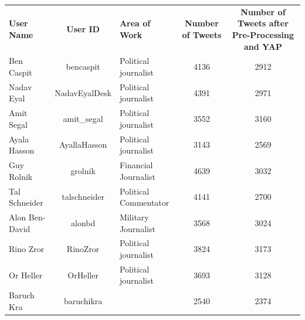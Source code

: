 \documentclass[a4paper]{article}
\begin{document}
\begin{table}[htbp]
  \centering
    \begin{tabular}{lcp{5.715em}cc}
    \textbf{User Name} & \multicolumn{1}{p{7.57em}}{\textbf{User ID}} & \textbf{Area of Work} & \multicolumn{1}{p{5.57em}}{\textbf{Number of Tweets}} & 		\multicolumn{1}{p{12.855em}}{\textbf{Number of Tweets after Pre-Processing and YAP}} \\
    Ben Caspit & \multicolumn{1}{p{7.57em}}{bencaspit} & Political journalist & 4136  & 2912 \\
    Nadav Eyal & \multicolumn{1}{p{7.57em}}{NadavEyalDesk} & Political journalist & 4391  & 2971 \\
    Amit Segal & \multicolumn{1}{p{7.57em}}{amit\_segal} & Political journalist & 3552  & 3160 \\
    Ayala Hasson & \multicolumn{1}{p{7.57em}}{AyallaHasson} & Political journalist & 3143  & 2569 \\
    Guy Rolnik & \multicolumn{1}{p{7.57em}}{grolnik} & Financial Journalist & 4639  & 3032 \\
    Tal Schneider & \multicolumn{1}{p{7.57em}}{talschneider} & Political Commentator & 4141  & 2700 \\
    Alon Ben-David & \multicolumn{1}{p{7.57em}}{alonbd} & Military Journalist & 3568  & 3024 \\
    Rino Zror & \multicolumn{1}{p{7.57em}}{RinoZror} & Political journalist & 3824  & 3173 \\
    Or Heller & \multicolumn{1}{p{7.57em}}{OrHeller} & Political journalist & 3693  & 3128 \\
    Baruch Kra & \multicolumn{1}{p{7.57em}}{baruchikra} & \multicolumn{1}{r}{} & 2540  & 2374 \\

\end{tabular}
\end{table}
\end{document}
